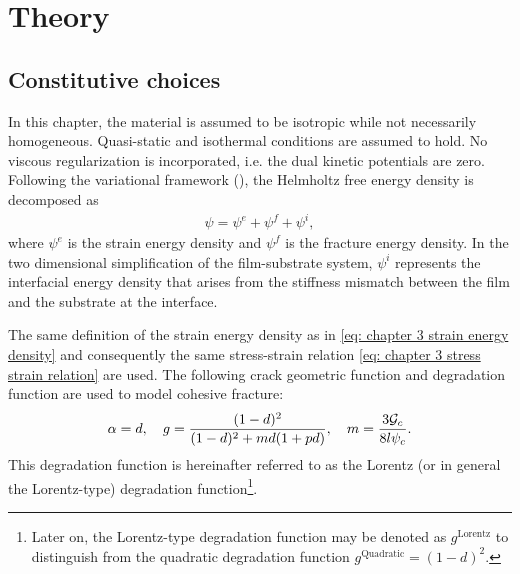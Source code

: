 \section{Theory}
\label{section: Chapter4/theory}

\subsection{Constitutive choices}

In this chapter, the material is assumed to be isotropic while not necessarily homogeneous. Quasi-static and isothermal conditions are assumed to hold. No viscous regularization is incorporated, i.e. the dual kinetic potentials are zero. Following the variational framework (), the Helmholtz free energy density is decomposed as
\begin{align}
  \psi = \psi^e + \psi^f + \psi^i,
\end{align}
where $\psi^e$ is the strain energy density and $\psi^f$ is the fracture energy density. In the two dimensional simplification of the film-substrate system, $\psi^i$ represents the interfacial energy density that arises from the stiffness mismatch between the film and the substrate at the interface.

The same definition of the strain energy density as in \eqref{eq: chapter 3 strain energy density} and consequently the same stress-strain relation \eqref{eq: chapter 3 stress strain relation} are used. The following crack geometric function and degradation function are used to model cohesive fracture:
\begin{align}
  \alpha = d, \quad g = \dfrac{(1-d)^2}{(1-d)^2+md(1+pd)}, \quad m = \dfrac{3 {\mathcal{G}_c}}{8 l \psi_c}.
\end{align}
This degradation function is hereinafter referred to as the Lorentz (or in general the Lorentz-type) degradation function\footnote{Later on, the Lorentz-type degradation function may be denoted as $g^\text{Lorentz}$ to distinguish from the quadratic degradation function $g^\text{Quadratic} = (1-d)^2$.}.

